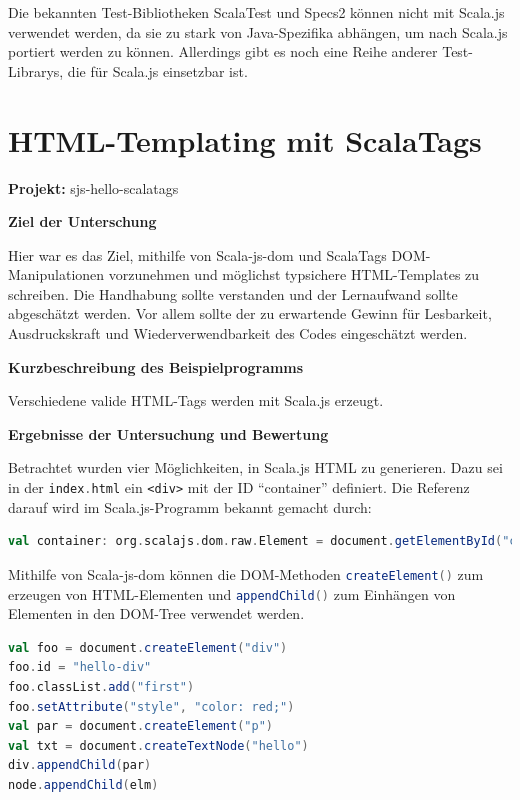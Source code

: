 \documentclass[a4paper, 12pt, hidelinks, listof=totoc, listoftables=totoc, bibliography=totoc]{scrreprt}
\newcommand{\code}[1]{\lstinline[language=Scala, style=inline]|#1|}
\newcommand{\scala}[1]{\lstinline[language=Scala, style=inline]|#1|}
\newcommand{\html}[1]{\lstinline[language=HTML5, style=inline]|#1|}
\newcommand{\MyMiniSec}[1]{\rmfamily\fontsize{12}{15}\selectfont
	\vspace{7pt}\textbf{#1} %
}
\begin{document}
Die bekannten Test-Bibliotheken ScalaTest und Specs2 können nicht mit Scala.js verwendet werden, da sie zu stark von Java-Spezifika abhängen, um nach Scala.js portiert werden zu können. Allerdings gibt es noch eine Reihe anderer Test-Librarys, die für Scala.js einsetzbar ist. \cite[\#OtherTestingLibraries]{haoyi.HOS}






\section{HTML-Templating mit ScalaTags}


\textbf{Projekt:} sjs-hello-scalatags

\MyMiniSec{Ziel der Unterschung}

Hier war es das Ziel, mithilfe von Scala-js-dom und ScalaTags \ac{DOM}-Manipulationen vorzunehmen und möglichst typsichere \ac{HTML}-Templates zu schreiben. Die Handhabung sollte verstanden und der Lernaufwand sollte abgeschätzt werden. Vor allem sollte der zu erwartende Gewinn für Lesbarkeit, Ausdruckskraft und Wiederverwendbarkeit des Codes eingeschätzt werden.


\MyMiniSec{Kurzbeschreibung des Beispielprogramms}

Verschiedene valide \ac{HTML}-Tags werden mit Scala.js erzeugt.

\MyMiniSec{Ergebnisse der Untersuchung und Bewertung}

Betrachtet wurden vier Möglichkeiten, in Scala.js \ac{HTML} zu generieren. Dazu sei in der \code{index.html} ein
\html{<div>} mit der ID "`container"' definiert. Die Referenz darauf wird im Scala.js-Programm bekannt gemacht durch:

\begin{lstlisting}[language=Scala, style=snippet]
val container: org.scalajs.dom.raw.Element = document.getElementById("container")
\end{lstlisting}

Mithilfe von Scala-js-dom können die \ac{DOM}-Methoden \scala{createElement()} zum erzeugen von \ac{HTML}-Elementen und \scala{appendChild()} zum Einhängen von Elementen in den DOM-Tree verwendet werden.

\begin{lstlisting}[language=Scala, caption={HTML-Generierung mit Scala-js-dom und Nodes.}]
val foo = document.createElement("div")
foo.id = "hello-div"
foo.classList.add("first")
foo.setAttribute("style", "color: red;")
val par = document.createElement("p")
val txt = document.createTextNode("hello")
div.appendChild(par)
node.appendChild(elm)
\end{lstlisting}
\end{document}
